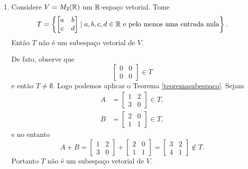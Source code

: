 \begin{exemplos}
\begin{enumerate}[label={\arabic*})]
		\item Considere $V = M_2(\mathbb{R})$ um $\mathbb{R}$-espaço vetorial. Tome
			\[
				T = \left\{
					\begin{bmatrix}
						a & b\\
						c & d
					\end{bmatrix}
					\mid a, b, c, d \in \mathbb{R} \mbox{ e pelo menos uma entrada nula}
				\right\}.
			\]
			Então $T$ não é um subespaço vetorial de $V$.
			\begin{solucao}
				De fato, observe que
				\[
					\begin{bmatrix}
						0 & 0\\
						0 & 0
					\end{bmatrix} \in T
				\]
				e então $T \ne \emptyset$. Logo podemos aplicar o Teorema \ref{teoremasubespaco}. Sejam
				\begin{align*}
					A &= \begin{bmatrix}1 & 2\\3 & 0\end{bmatrix} \in T,\\
					B &= \begin{bmatrix}2 & 0\\1 & 1\end{bmatrix} \in T,
				\end{align*}	
				e no entanto
				\[
					A + B = \begin{bmatrix}1 & 2\\3 & 0\end{bmatrix} +
					\begin{bmatrix}2 & 0\\1 & 1\end{bmatrix} =
					\begin{bmatrix}3 & 2\\4 & 1 \end{bmatrix}\notin T.
				\]
				Portanto $T$ não é um subespaço vetorial de $V$.
			\end{solucao}
	\end{enumerate}
\end{exemplos}

